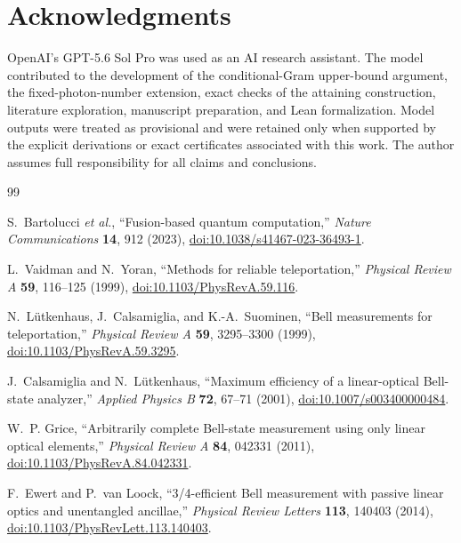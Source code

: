 \documentclass[11pt]{article}
\theoremstyle{remark}
\begin{document}
\section*{Acknowledgments}

OpenAI's GPT-5.6 Sol Pro was used as an AI research assistant. The model
contributed to the development of the conditional-Gram upper-bound
argument, the fixed-photon-number extension, exact checks of the
attaining construction, literature exploration, manuscript preparation,
and Lean formalization. Model outputs were treated as provisional and
were retained only when supported by the explicit derivations or exact
certificates associated with this work. The author assumes full
responsibility for all claims and conclusions.

\begin{thebibliography}{99}

S.~Bartolucci \emph{et al.},
``Fusion-based quantum computation,''
\emph{Nature Communications} \textbf{14}, 912 (2023),
\href{https://doi.org/10.1038/s41467-023-36493-1}{doi:10.1038/s41467-023-36493-1}.

L.~Vaidman and N.~Yoran,
``Methods for reliable teleportation,''
\emph{Physical Review A} \textbf{59}, 116--125 (1999),
\href{https://doi.org/10.1103/PhysRevA.59.116}{doi:10.1103/PhysRevA.59.116}.

N.~L\"utkenhaus, J.~Calsamiglia, and K.-A.~Suominen,
``Bell measurements for teleportation,''
\emph{Physical Review A} \textbf{59}, 3295--3300 (1999),
\href{https://doi.org/10.1103/PhysRevA.59.3295}{doi:10.1103/PhysRevA.59.3295}.

J.~Calsamiglia and N.~L\"utkenhaus,
``Maximum efficiency of a linear-optical Bell-state analyzer,''
\emph{Applied Physics B} \textbf{72}, 67--71 (2001),
\href{https://doi.org/10.1007/s003400000484}{doi:10.1007/s003400000484}.

W.~P. Grice,
``Arbitrarily complete Bell-state measurement using only linear optical elements,''
\emph{Physical Review A} \textbf{84}, 042331 (2011),
\href{https://doi.org/10.1103/PhysRevA.84.042331}{doi:10.1103/PhysRevA.84.042331}.

F.~Ewert and P.~van Loock,
``3/4-efficient Bell measurement with passive linear optics and unentangled ancillae,''
\emph{Physical Review Letters} \textbf{113}, 140403 (2014),
\href{https://doi.org/10.1103/PhysRevLett.113.140403}{doi:10.1103/PhysRevLett.113.140403}.


\end{thebibliography}
\end{document}
